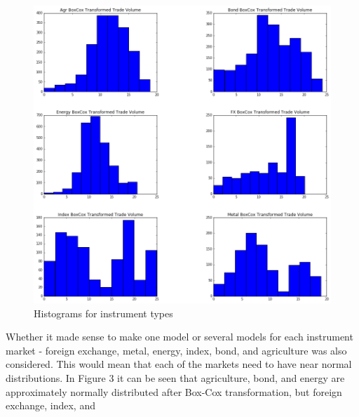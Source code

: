 \documentclass[12pt]{article}
\begin{document}
\begin{figure}[H]
	\begin{center}	
		\includegraphics[width=15cm]{types_bc_hist.png}
		\caption{Histograms for instrument types}
		\label{fig:2}
	\end{center}
\end{figure}
Whether it made sense to make one model or several models for each instrument market - foreign exchange, metal, energy, index, bond, and agriculture was also considered. This would mean that each of the markets need to have near normal distributions. In Figure 3 it can be seen that agriculture, bond, and energy are approximately normally distributed after Box-Cox transformation, but foreign exchange, index, and  
\end{document}
